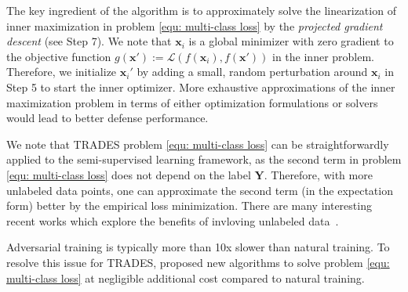 \documentclass[11pt]{article}
\newcommand{\x}{\bm{x}}
\newcommand{\Y}{\bm{Y}}
\newcommand{\0}{\mathbf{0}}
\newcommand{\1}{\mathbf{1}}
\newcommand{\cL}{\mathcal{L}}
\begin{document}
The key ingredient of the algorithm is to approximately solve the linearization of inner maximization in problem \eqref{equ: multi-class loss} by the \emph{projected gradient descent} (see Step 7). We note that $\x_i$ is a global minimizer with zero gradient to the objective function $g(\x'):=\cL(f(\x_{i}),f(\x'))$ in the inner problem. Therefore, we initialize $\x_i'$ by adding a small, random perturbation around $\x_i$ in Step 5 to start the inner optimizer. More exhaustive approximations of the inner maximization problem in terms of either optimization formulations or solvers would lead to better defense performance.


\medskip
{}
We note that TRADES problem \eqref{equ: multi-class loss} can be straightforwardly applied to the semi-supervised learning framework, as the second term in problem \eqref{equ: multi-class loss} does not depend on the label $\Y$. Therefore, with more unlabeled data points, one can approximate the second term (in the expectation form) better by the empirical loss minimization. There are many interesting recent works which explore the benefits of invloving unlabeled data~\cite{carmon2019unlabeled,stanforth2019labels,zhai2019adversarially}.

\medskip
{}
Adversarial training is typically more than 10x slower than natural training. To resolve this issue for TRADES, \cite{shafahi2019adversarial,zhang2019you} proposed new algorithms to solve problem \eqref{equ: multi-class loss} at negligible additional cost compared to natural training.
\end{document}

